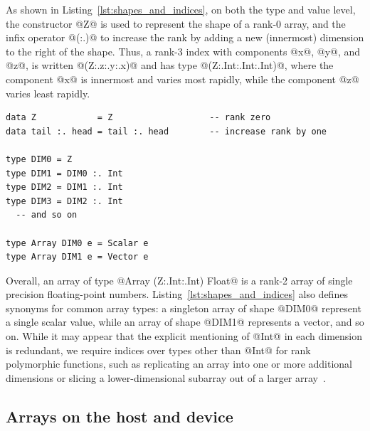 As shown in Listing~\ref{lst:shapes_and_indices}, on both the type and value
level, the constructor @Z@ is used to represent the shape of a rank-0 array, and
the infix operator @(:.)@ to increase the rank by adding a new (innermost)
dimension to the right of the shape. Thus, a rank-3 index with components @x@,
@y@, and @z@, is written @(Z:.z:.y:.x)@ and has type @(Z:.Int:.Int:.Int)@, where
the component @x@ is innermost and varies most rapidly, while the component @z@
varies least rapidly.

\begin{lstlisting}[style=haskell_float
    ,label=lst:shapes_and_indices
    ,caption={Types of array shapes and indices}]
data Z            = Z                   -- rank zero
data tail :. head = tail :. head        -- increase rank by one

type DIM0 = Z
type DIM1 = DIM0 :. Int
type DIM2 = DIM1 :. Int
type DIM3 = DIM2 :. Int
  -- and so on

type Array DIM0 e = Scalar e
type Array DIM1 e = Vector e
\end{lstlisting}

Overall, an array of type @Array (Z:.Int:.Int) Float@ is a rank-2 array of
single precision floating-point numbers. Listing~\ref{lst:shapes_and_indices}
also defines synonyms for common array types: a singleton array of shape @DIM0@
represent a single scalar value, while an array of shape @DIM1@ represents a
vector, and so on. While it may appear that the explicit mentioning of @Int@ in
each dimension is redundant, we require indices over types other than @Int@ for
rank polymorphic functions, such as replicating an array into one or more
additional dimensions or slicing a lower-dimensional subarray out of a larger
array~\cite{Keller:2010er,Chakravarty:2011fr}.


\subsection{Arrays on the host and device}
\label{sec:arrays_on_the_host_and_device}

